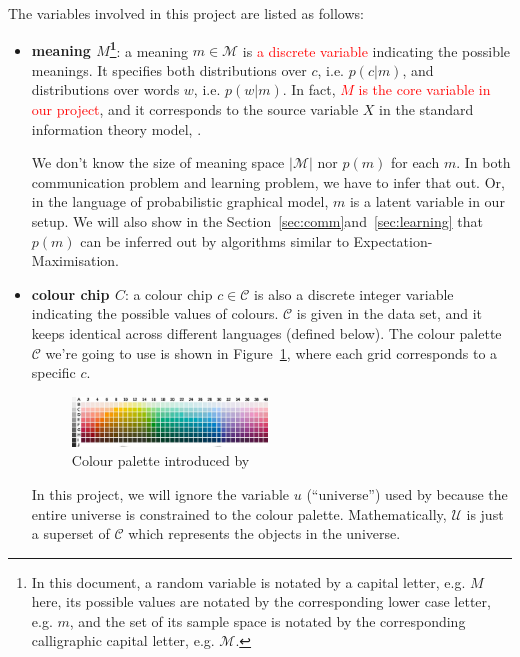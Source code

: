 \documentclass[11pt]{article}
\begin{document}
The variables involved in this project are listed as follows:
\begin{itemize}[leftmargin=*]
    \item \textbf{meaning $M$\footnote{In this document, a random variable is notated by a capital letter, e.g. $M$ here, its possible values are notated by the corresponding lower case letter, e.g. $m$, and the set of its sample space is notated by the corresponding calligraphic capital letter, e.g. $\mathcal{M}$.}}: a meaning $m\in\mathcal{M}$ is \textcolor{red}{a discrete variable} indicating the possible meanings.
    It specifies both distributions over $c$, i.e. $p(c|m)$, and distributions over words $w$, i.e. $p(w|m)$.
    In fact, \textcolor{red}{$M$ is the core variable in our project}, and it corresponds to the source variable $X$ in the standard information theory model, \citep[e.g.][]{RDT}.
    
    We don't know the size of meaning space $|\mathcal{M}|$ nor $p(m)$ for each $m$.
    In both communication problem and learning problem, we have to infer that out.
    Or, in the language of probabilistic graphical model, $m$ is a latent variable in our setup.
    We will also show in the Section~\ref{sec:comm}and~\ref{sec:learning} that $p(m)$ can be inferred out by algorithms similar to Expectation-Maximisation. 

    \item \textbf{colour chip $C$}: a colour chip $c\in\mathcal{C}$ is also a discrete integer variable indicating the possible values of colours. 
    $\mathcal{C}$ is given in the data set, and it keeps identical across different languages (defined below). 
    The colour palette $\mathcal{C}$ we're going to use is shown in Figure~\ref{fig:colour_palette}, where each grid corresponds to a specific $c$.
        \begin{figure}[h]
            \centering
            \includegraphics[width=0.49\textwidth]{docs/intro_rate_distortion/graphs/colour_palette.jpg}
            \caption{Colour palette introduced by \citet{berlin1991basic}}
            \label{fig:colour_palette}
        \end{figure}
        
    In this project, we will ignore the variable $u$ (``universe'') used by \citet{zaslavsky2018efficient} because the entire universe is constrained to the colour palette. 
    Mathematically, $\mathcal{U}$ is just a superset of $\mathcal{C}$ which represents the objects in the universe.
    

\end{itemize}
\end{document}
